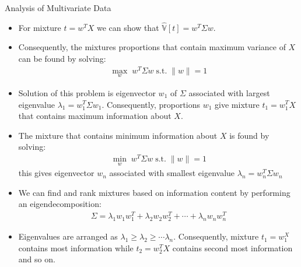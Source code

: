 \documentclass[9pt]{beamer}
\begin{document}
\begin{frame}{Analysis of Multivariate Data}

\begin{itemize}
\item For mixture $t=w^TX$ we can show that $\hat{\mathbb{V}}[t]=w^T\Sigma w$. 
\item Consequently, the mixtures proportions that contain maximum variance of $X$ can be found by solving:
\begin{align*}
\max_{w}\; w^T\Sigma w\; \textrm{s.t.}\; \|w\|=1
\end{align*}
\item Solution of this problem is eigenvector $w_1$ of $\Sigma$ associated with largest eigenvalue $\lambda_1=w^T_1\Sigma w_1$. Consequently, proportions $w_1$ give mixture  $t_1=w_1^TX$ that contains maximum information about $X$. 
\item The mixture that contains minimum information about $X$ is found by solving:
\begin{align*}
\min_{w}\; w^T\Sigma w\; \textrm{s.t.}\; \|w\|=1
\end{align*}
this gives eigenvector $w_n$ associated with smallest eigenvalue $\lambda_n=w^T_n\Sigma w_n$

\item We can find and rank mixtures based on information content by performing an eigendecomposition: 
\begin{align*}
\Sigma = \lambda_1w_1w_1^T+\lambda_2w_2w_2^T+\cdots + \lambda_n w_nw_n^T
\end{align*}
\item Eigenvalues are arranged as $\lambda_1\geq \lambda_2\geq \cdots \lambda _n$. Consequently, mixture $t_1=w_1^X$ contains most information while $t_2=w_2^TX$ contains second most information and so on. 

 
\end{itemize}


\end{frame}

\end{document}
